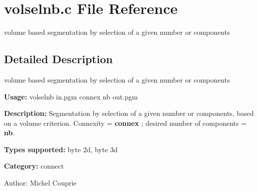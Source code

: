 \section{volselnb.c File Reference}
\label{volselnb_8c}
volume based segmentation by selection of a given number or components 



\subsection{Detailed Description}
volume based segmentation by selection of a given number or components 

{\bf Usage:} volselnb in.pgm connex nb out.pgm

{\bf Description:} Segmentation by selection of a given number or components, based on a volume criterion. Connexity = {\bf connex} ; desired number of components = {\bf nb}.

{\bf Types supported:} byte 2d, byte 3d

{\bf Category:} connect

\begin{Desc}
\item[Author:]Michel Couprie \end{Desc}
